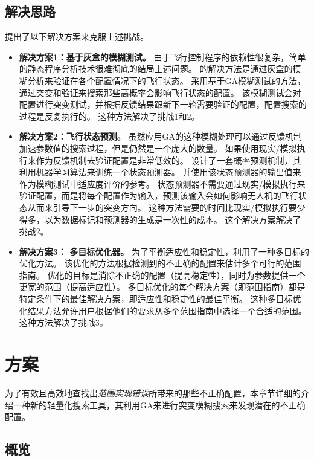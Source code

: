 \subsection{解决思路}
\icsearcher 提出了以下解决方案来克服上述挑战。

\begin{itemize}

\item \textbf{解决方案1：基于灰盒的模糊测试。}
由于飞行控制程序的依赖性很复杂，简单的静态程序分析技术很难彻底的结局上述问题。
\icsearcher 的解决方法是通过灰盒的模糊分析来验证在各个配置情况下的飞行状态。
\icsearcher 采用基于GA模糊测试的方法，通过突变和验证来搜索那些高概率会影响飞行状态的配置。
该模糊测试会对配置进行突变测试，并根据反馈结果跟新下一轮需要验证的配置，配置搜索的过程是反复执行的。
这种方法解决了挑战1和2。

\item \textbf{解决方案2：飞行状态预测。}
虽然应用GA的这种模糊处理可以通过反馈机制加速参数值的搜索过程，但是仍然是一个庞大的数量。
如果使用现实/模拟执行来作为反馈机制去验证配置是非常低效的。
\icsearcher 设计了一套概率预测机制，其利用机器学习算法来训练一个状态预测器。
并使用该状态预测器的输出值来作为模糊测试中适应度评价的参考。
状态预测器不需要通过现实/模拟执行来验证配置，而是将每个配置作为输入，预测该输入会如何影响无人机的飞行状态从而来引导下一步的突变方向。
这种方法需要的时间比现实/模拟执行要少得多，以为数据标记和预测器的生成是一次性的成本。
这个解决方案解决了挑战2。

\item \textbf{解决方案3： 多目标优化器。}
为了平衡适应性和稳定性，\icsearcher 利用了一种多目标的优化方法。
该优化的方法根据检测到的不正确的配置来估计多个可行的范围指南。
优化的目标是消除不正确的配置（提高稳定性），同时为参数提供一个更宽的范围（提高适应性）。
多目标优化的每个解决方案（即范围指南）都是特定条件下的最佳解决方案，即适应性和稳定性的最佳平衡。
这种多目标优化结果方法允许用户根据他们的要求从多个范围指南中选择一个合适的范围。
这种方法解决了挑战3。
\end{itemize}


\section{方案}
为了有效且高效地查找出\textit{范围实现错误}所带来的那些不正确配置，本章节详细的介绍一种新的轻量化搜索工具\icsearcher ，其利用GA来进行突变模糊搜索来发现潜在的不正确配置。

\subsection{概览}

